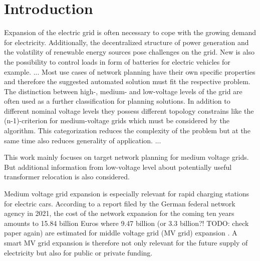 \chapter{Introduction}\label{chap:introduction}



Expansion of the electric grid is often necessary to cope with the growing demand for electricity. Additionally, the decentralized structure of power generation and the volatility of renewable energy sources pose challenges on the grid. New is also the possibility to control loads in form of batteries for electric vehicles for example.
...
Most use cases of network planning have their own specific properties and therefore the suggested automated solution must fit the respective problem. The distinction between high-, medium- and low-voltage levels of the grid are often used as a further classification for planning solutions. In addition to different nominal voltage levels they possess different topology constrains like the (n-1)-criterion for medium-voltage grids which must be considered by the algorithm. This categorization reduces the complexity of the problem but at the same time also reduces generality of application. ...

This work mainly focuses on target network planning for medium voltage grids. But additional information from low-voltage level about potentially useful transformer relocation is also considered.

Medium voltage grid expansion is especially relevant for rapid charging stations for electric cars. According to a report filed by the German federal network agency in 2021, the cost of the network expansion for the coming ten years amounts to 15.84 billion Euros where 9.47 billion (or 3.3 billion?! TODO: check paper again) are estimated for middle voltage grid (MV grid) expansion \cite{Ausbaubericht_2021_page14}. A smart MV grid expansion is therefore not only relevant for the future supply of electricity but also for public or private funding. \\

